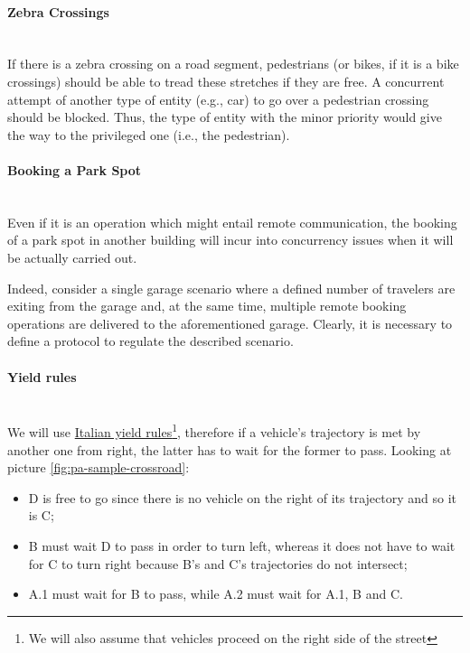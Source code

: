 \paragraph{Zebra Crossings} \mbox{} \\

If there is a zebra crossing on a road segment, pedestrians (or bikes, if it
is a bike crossings) should be able to tread these stretches if they are free.
A concurrent attempt of another type of entity (e.g., car) to go over a
pedestrian crossing should be blocked. Thus, the type of
entity with the minor priority would give the way to the
privileged one (i.e., the pedestrian).

\paragraph{Booking a Park Spot} \mbox{} \\

Even if it is an operation which might entail remote communication, the booking
of a park spot in another building will incur into concurrency issues when it
will be actually carried out.

Indeed, consider a single garage scenario where a defined number of travelers
are exiting from the garage and, at the same time, multiple remote booking
operations are delivered to the aforementioned garage. Clearly,
it is necessary to define a protocol to regulate the described scenario.

\paragraph{Yield rules} \mbox{} \\

We will use \href{http://www.aci.it/i-servizi/normative/codice-della-strada/titolo-v-norme-di-comportamento/art-145-precedenza.html}{Italian yield rules}\footnote{We will also assume that vehicles proceed on the right side of the
street}, therefore if a vehicle's trajectory is met by another one from right,
the latter has to wait for the former to pass.
Looking at picture \ref{fig:pa-sample-crossroad}:
\begin{itemize}
    \item D is free to go since there is no vehicle on the right of its trajectory and so it is C;
    \item B must wait D to pass in order to turn left, whereas it does not have to wait
for C to turn right because B's and C's trajectories do not intersect;
    \item A.1 must wait for B to pass, while A.2 must wait for A.1, B and C.
\end{itemize}

